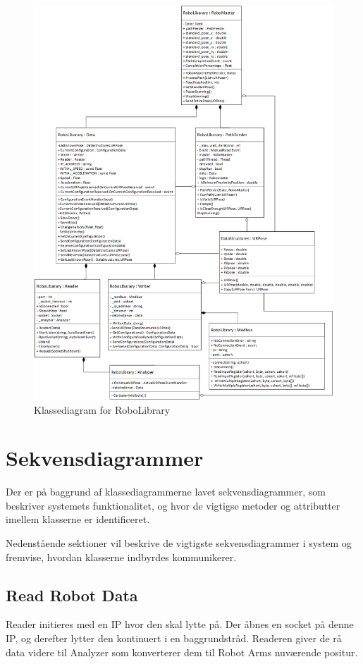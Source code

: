 \begin{figure}[H]
    \centering
    \includegraphics[width=1\textwidth]{figurer/d/Design/Class/uml_class_robolibrary}
    \caption{Klassediagram for RoboLibrary}
    \label{class_RoboLib}
\end{figure}

\newpage
\section{Sekvensdiagrammer}
Der er på baggrund af klassediagrammerne lavet sekvensdiagrammer, som beskriver systemets funktionalitet, og hvor de vigtigse metoder og attributter imellem klasserne er identificeret.

Nedenstående sektioner vil beskrive de vigtigste sekvensdiagrammer i system og fremvise, hvordan klasserne indbyrdes kommunikerer. 

\subsection{Read Robot Data} 
Reader initieres med en IP hvor den skal lytte på. 
Der åbnes en socket på denne IP, og derefter lytter den kontinuert i en baggrundstråd. 
Readeren giver de rå data videre til Analyzer som konverterer dem til Robot Arms nuværende positur.

